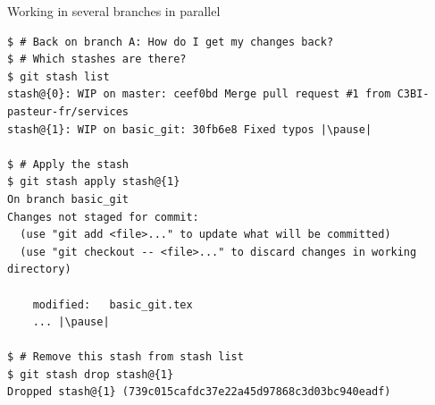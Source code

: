 \begin{frame}[fragile]{Working in several branches in parallel}
	\begin{tiny}
		\begin{lstlisting}
$ # Back on branch A: How do I get my changes back?
$ # Which stashes are there?
$ git stash list
stash@{0}: WIP on master: ceef0bd Merge pull request #1 from C3BI-pasteur-fr/services
stash@{1}: WIP on basic_git: 30fb6e8 Fixed typos |\pause|

$ # Apply the stash
$ git stash apply stash@{1}
On branch basic_git
Changes not staged for commit:
  (use "git add <file>..." to update what will be committed)
  (use "git checkout -- <file>..." to discard changes in working directory)

	modified:   basic_git.tex
	... |\pause|
	
$ # Remove this stash from stash list
$ git stash drop stash@{1}
Dropped stash@{1} (739c015cafdc37e22a45d97868c3d03bc940eadf)
		\end{lstlisting}
	\end{tiny}
\end{frame}

